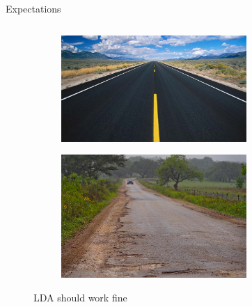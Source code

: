 \documentclass{beamer}
\begin{document}
	\begin{frame}[t]{Expectations}
	 \begin{columns}
      \begin{column}{0.48\textwidth}
        \begin{figure}[t]
	  	 \begin{subfigure}{1.\textwidth}
  		  \includegraphics[width=1.\linewidth]{LDA_perfect.jpeg}
 	     \end{subfigure}
 	     \begin{subfigure}{1.\textwidth}
  		  \includegraphics[width=1.\linewidth]{LDA_works.jpeg}  
 	     \end{subfigure}
	     \caption{LDA should work fine}
	    \end{figure}
      \end{column}
      \begin{column}{0.48\textwidth}
        \begin{figure}[t]
	  	 \begin{subfigure}{.9\textwidth}

\end{subfigure}
\end{figure}
\end{column}
\end{columns}
\end{frame}
\end{document}
